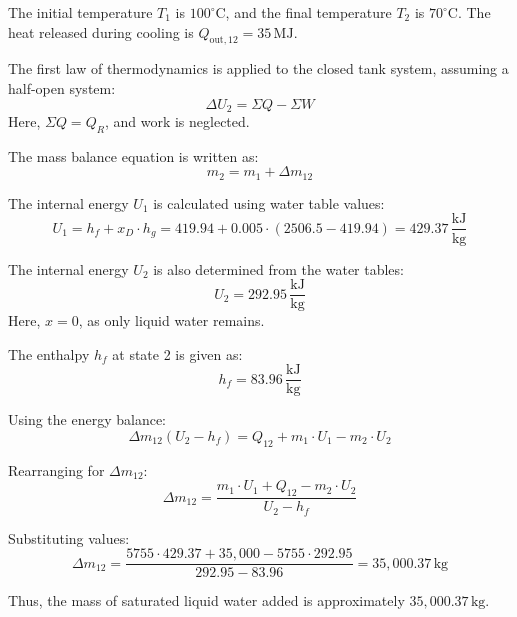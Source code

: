 The initial temperature \( T_1 \) is \( 100^\circ\text{C} \), and the final temperature \( T_2 \) is \( 70^\circ\text{C} \). The heat released during cooling is \( Q_{\text{out},12} = 35 \, \text{MJ} \).  

The first law of thermodynamics is applied to the closed tank system, assuming a half-open system:  
\[
\Delta U_2 = \Sigma Q - \Sigma W
\]  
Here, \( \Sigma Q = Q_R \), and work is neglected.  

The mass balance equation is written as:  
\[
m_2 = m_1 + \Delta m_{12}
\]  

The internal energy \( U_1 \) is calculated using water table values:  
\[
U_1 = h_f + x_D \cdot h_g = 419.94 + 0.005 \cdot (2506.5 - 419.94) = 429.37 \, \frac{\text{kJ}}{\text{kg}}
\]  

The internal energy \( U_2 \) is also determined from the water tables:  
\[
U_2 = 292.95 \, \frac{\text{kJ}}{\text{kg}}
\]  
Here, \( x = 0 \), as only liquid water remains.  

The enthalpy \( h_f \) at state 2 is given as:  
\[
h_f = 83.96 \, \frac{\text{kJ}}{\text{kg}}
\]  

Using the energy balance:  
\[
\Delta m_{12} (U_2 - h_f) = Q_{12} + m_1 \cdot U_1 - m_2 \cdot U_2
\]  

Rearranging for \( \Delta m_{12} \):  
\[
\Delta m_{12} = \frac{m_1 \cdot U_1 + Q_{12} - m_2 \cdot U_2}{U_2 - h_f}
\]  

Substituting values:  
\[
\Delta m_{12} = \frac{5755 \cdot 429.37 + 35,000 - 5755 \cdot 292.95}{292.95 - 83.96} = 35,000.37 \, \text{kg}
\]  

Thus, the mass of saturated liquid water added is approximately \( 35,000.37 \, \text{kg} \).